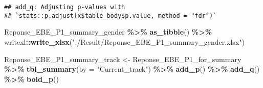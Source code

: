 \documentclass[
]{article}
\newenvironment{Shaded}{\begin{snugshade}}{\end{snugshade}}
\newcommand{\AttributeTok}[1]{\textcolor[rgb]{0.13,0.29,0.53}{#1}}
\newcommand{\FunctionTok}[1]{\textcolor[rgb]{0.13,0.29,0.53}{\textbf{#1}}}
\newcommand{\NormalTok}[1]{#1}
\newcommand{\OtherTok}[1]{\textcolor[rgb]{0.56,0.35,0.01}{#1}}
\newcommand{\SpecialCharTok}[1]{\textcolor[rgb]{0.81,0.36,0.00}{\textbf{#1}}}
\newcommand{\StringTok}[1]{\textcolor[rgb]{0.31,0.60,0.02}{#1}}
\begin{document}
\begin{verbatim}
## add_q: Adjusting p-values with
## `stats::p.adjust(x$table_body$p.value, method = "fdr")`
\end{verbatim}

\begin{Shaded}
\begin{Highlighting}[]
\NormalTok{Reponse\_EBE\_P1\_summary\_gender }\SpecialCharTok{\%\textgreater{}\%} \FunctionTok{as\_tibble}\NormalTok{() }\SpecialCharTok{\%\textgreater{}\%}
\NormalTok{  writexl}\SpecialCharTok{::}\FunctionTok{write\_xlsx}\NormalTok{(}\StringTok{"./Result/Reponse\_EBE\_P1\_summary\_gender.xlsx"}\NormalTok{)}


\NormalTok{Reponse\_EBE\_P1\_summary\_track }\OtherTok{\textless{}{-}}
\NormalTok{  Reponse\_EBE\_P1\_for\_summary }\SpecialCharTok{\%\textgreater{}\%} \FunctionTok{tbl\_summary}\NormalTok{(}\AttributeTok{by =} \StringTok{"Current\_track"}\NormalTok{) }\SpecialCharTok{\%\textgreater{}\%}
  \FunctionTok{add\_p}\NormalTok{() }\SpecialCharTok{\%\textgreater{}\%} \FunctionTok{add\_q}\NormalTok{() }\SpecialCharTok{\%\textgreater{}\%} \FunctionTok{bold\_p}\NormalTok{()}
\end{Highlighting}
\end{Shaded}
\end{document}
